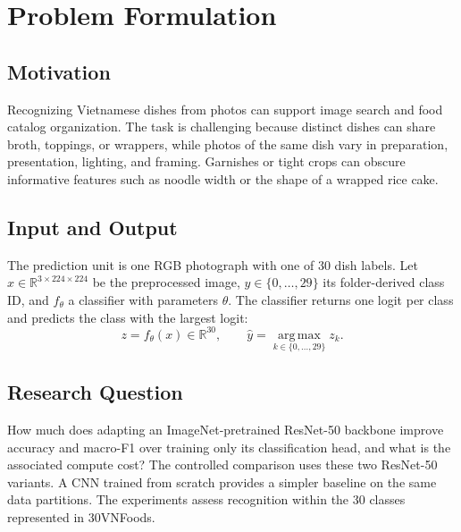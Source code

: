 \section{Problem Formulation}
\label{sec:problem-formulation}

\subsection{Motivation}

Recognizing Vietnamese dishes from photos can support image search and food catalog organization. The task is challenging because distinct dishes can share broth, toppings, or wrappers, while photos of the same dish vary in preparation, presentation, lighting, and framing. Garnishes or tight crops can obscure informative features such as noodle width or the shape of a wrapped rice cake.

\subsection{Input and Output}

The prediction unit is one RGB photograph with one of 30 dish labels. Let $x\in\mathbb{R}^{3\times224\times224}$ be the preprocessed image, $y\in\{0,\ldots,29\}$ its folder-derived class ID, and $f_\theta$ a classifier with parameters $\theta$. The classifier returns one logit per class and predicts the class with the largest logit:
\begin{equation}
    z=f_\theta(x)\in\mathbb{R}^{30},
    \qquad \hat{y}=\operatorname*{arg\,max}_{k\in\{0,\ldots,29\}}z_k.
\end{equation}

\subsection{Research Question}

How much does adapting an ImageNet-pretrained ResNet-50 backbone improve accuracy and macro-F1 over training only its classification head, and what is the associated compute cost? The controlled comparison uses these two ResNet-50 variants. A CNN trained from scratch provides a simpler baseline on the same data partitions. The experiments assess recognition within the 30 classes represented in 30VNFoods.
